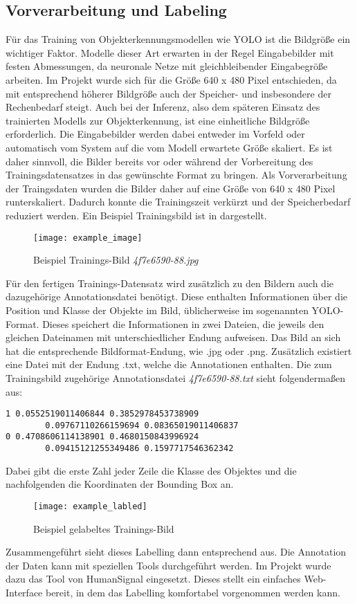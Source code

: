 \subsection{Vorverarbeitung und Labeling}
Für das Training von Objekterkennungsmodellen wie YOLO ist die Bildgröße ein wichtiger Faktor.
Modelle dieser Art erwarten in der Regel Eingabebilder mit festen Abmessungen, da neuronale Netze mit gleichbleibender Eingabegröße arbeiten.
\newPar
Im Projekt wurde sich für die Größe 640 x 480 Pixel entschieden, da mit entsprechend höherer Bildgröße auch der Speicher- und insbesondere der Rechenbedarf steigt.
Auch bei der Inferenz, also dem späteren Einsatz des trainierten Modells zur Objekterkennung, ist eine einheitliche Bildgröße erforderlich.
Die Eingabebilder werden dabei entweder im Vorfeld oder automatisch vom System auf die vom Modell erwartete Größe skaliert.
Es ist daher sinnvoll, die Bilder bereits vor oder während der Vorbereitung des Trainingsdatensatzes in das gewünschte Format zu bringen.
Als Vorverarbeitung der Traingsdaten wurden die Bilder daher auf eine Größe von 640 x 480 Pixel runterskaliert.
Dadurch konnte die Trainingszeit verkürzt und der Speicherbedarf reduziert werden. 
Ein Beispiel Trainingsbild ist in  dargestellt.
\cite{yolo_pre_docu}
\begin{figure}[H]
    \centering
    \texttt{[image: example\_image]}
    \caption{Beispiel Trainings-Bild \textit{4f7e6590-88.jpg}}\label{beispiel_trainingsbild}
\end{figure}
Für den fertigen Trainings\hyp{}Datensatz wird zusätzlich zu den Bildern auch die dazugehörige Annotationsdatei benötigt. 
Diese enthalten Informationen über die Position und Klasse der Objekte im Bild, üblicherweise im sogenannten YOLO-Format.
Dieses speichert die Informationen in zwei Dateien, die jeweils den gleichen Dateinamen mit unterschiedlicher Endung aufweisen.
Das Bild an sich hat die entsprechende Bildformat-Endung, wie .jpg oder .png. Zusätzlich existiert eine Datei mit der Endung .txt, welche die Annotationen enthalten.
\cite{yolo_format_docu}
\newPar
Die zum Trainingsbild zugehörige Annotationsdatei \textit{4f7e6590-88.txt} sieht folgendermaßen aus:
\begin{lstlisting}
1 0.0552519011406844 0.3852978453738909
        0.09767110266159694 0.08365019011406837
0 0.4708606114138901 0.4680150843996924
        0.09415121255349486 0.1597717546362342
\end{lstlisting}

Dabei gibt die erste Zahl jeder Zeile die Klasse des Objektes und die nachfolgenden die Koordinaten der Bounding Box an.
\cite{yolo_format_docu}
\begin{figure}[H]
    \centering
    \texttt{[image: example\_labled]}
    \caption{Beispiel gelabeltes Trainings-Bild}\label{beispiel_trainingsbild_labeld}
\end{figure}
Zusammengeführt sieht dieses Labelling dann entsprechend  aus.
Die Annotation der Daten kann mit speziellen Tools durchgeführt werden.
Im Projekt wurde dazu das Tool  von HumanSignal eingesetzt. Dieses stellt ein einfaches Web-Interface bereit, in dem das Labelling komfortabel vorgenommen werden kann.
\cite{labelstudio}
